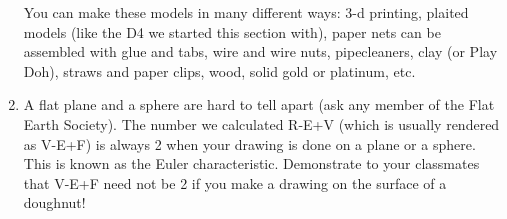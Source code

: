 \begin{enumerate}
 You can make these models in many different ways:  3-d printing, plaited models (like the D4 we started this section with), paper nets can be assembled with glue and tabs, wire and wire nuts, pipecleaners, clay (or Play Doh), straws and paper clips, wood, solid gold or platinum, etc.

       
        
    \item A flat plane and a sphere are hard to tell apart (ask any member of the Flat Earth Society).  The number we calculated R-E+V (which is usually rendered as V-E+F) is always 2 when your drawing is done on a plane or a sphere.  This is known as the Euler characteristic.  Demonstrate to your classmates that V-E+F need not be 2 if you make a drawing on the surface of a doughnut!
    
\end{enumerate}
